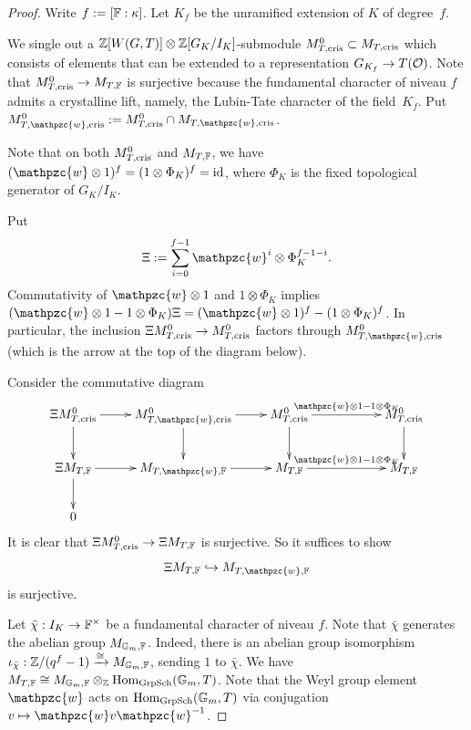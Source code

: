 \documentclass[10pt,a4paper,twoside]{article}
\begin{document}
\begin{proof}
Write $f:= [{\mathbb{F}}:\kappa]$. Let $K_f$ be the unramified extension of $K$ of degree~$f$.

We single out a ${\mathbb{Z}}[W(G,T)] \otimes {\mathbb{Z}}[G_K/I_K]$-submodule $M_{T, \operatorname{cris}}^{0} \subset M_{T, \operatorname{cris}}$
which consists
of elements that can be extended to a representation $G_{K_f}\to T(\mathcal{O})$.
Note that
$
M_{T, \operatorname{cris}}^{0} \to M_{T, {\mathbb{F}}}
$
is surjective because the fundamental character of niveau $f$ 
admits a crystalline lift, namely, the Lubin-Tate character of the field~$K_f$.
Put $M_{T, \mathpzc{w}, \cris}^0 := M_{T, \cris}^{0} \cap M_{T, \mathpzc{w}, \cris}$.

Note that on both $M_{T,\operatorname{cris}}^0$ and
$M_{T,{\mathbb{F}}}$, we have $(\mathpzc{w} \otimes 1)^f = (1 \otimes \Phi_K)^f = \Id$,
where $\Phi_K$ is the fixed topological generator of $G_K/I_K$.

Put
$$
\Xi := \sum_{i = 0}^{f-1} \mathpzc{w}^i \otimes \Phi_K^{f-1-i}.
$$
Commutativity of $\mathpzc{w}\otimes 1$ and $1\otimes \Phi_K$
implies $(\mathpzc{w} \otimes 1 - 1 \otimes \Phi_K)\Xi = (\mathpzc{w} \otimes 1)^f - (1 \otimes \Phi_K)^f$.
In particular, the inclusion 
$\Xi M_{T,\operatorname{cris}}^0 \to M_{T,\operatorname{cris}}^0$
factors through $M_{T, \mathpzc{w}, \cris}^0$ (which is the arrow at the top of the diagram below).

Consider the commutative diagram
$$
\xymatrix{
\Xi M_{T,\cris}^0 \ar[r] \ar[d] &
M_{T, \mathpzc{w}, \cris}^0 \ar[d]\ar[r] &
M_{T,\cris}^0\ar[d] \ar[rr]^{\mathpzc{w} \otimes 1 - 1 \otimes \Phi_K} && M_{T,\cris}^0 \ar[d]\\
\Xi M_{T,\modp} \ar[r]\ar[d] &
M_{T, \mathpzc{w}, \modp} \ar[r] &
M_{T,\modp} \ar[rr]^{\mathpzc{w} \otimes 1 - 1 \otimes \Phi_K} && M_{T,\modp} \\
0 & & &
}
$$
It is clear that $\Xi M_{T,\operatorname{cris}}^0 \to \Xi M_{T, {\mathbb{F}}}$ is surjective.
So it suffices to show
$$
\Xi M_{T,\modp} \hookrightarrow
M_{T, \mathpzc{w}, \modp}
$$
is surjective.

Let $\bar \chi: I_K \to {\mathbb{F}}^\times$
be a fundamental character of niveau $f$.
Note that $\bar\chi$ generates the abelian group $M_{\mathbb{G}_m, {\mathbb{F}}}$.
Indeed, there is an abelian group isomorphism
$\iota_{\bar\chi}:{\mathbb{Z}}/(q^f-1) \xrightarrow{\cong} M_{\mathbb{G}_m, {\mathbb{F}}}$,
sending $1$ to $\bar\chi$.
We have $M_{T, {\mathbb{F}}} \cong M_{\mathbb{G}_m, {\mathbb{F}}} \otimes_{{\mathbb{Z}}} \operatorname{Hom}_{\text{GrpSch}}(\mathbb{G}_m, T)$.
Note that the Weyl group element $\mathpzc{w}$ acts on $\operatorname{Hom}_{\text{GrpSch}}(\mathbb{G}_m, T)$ via conjugation $v \mapsto \mathpzc{w} v \mathpzc{w}^{-1}$.


\end{proof}
\end{document}

